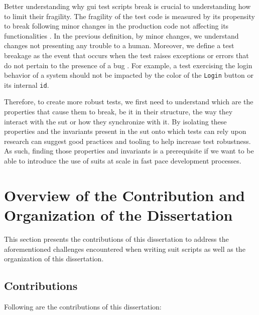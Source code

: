 Better understanding why \gls{gui} test scripts break is crucial to understanding how to limit their fragility. The fragility of the test code is measured by its propensity to break following minor changes in the production code not affecting its functionalities \cite{Garousi2016, Coppola2019}. In the previous definition, by minor changes, we understand changes not presenting any trouble to a human. Moreover, we define a test breakage as the event that occurs when the test raises exceptions or errors that do not pertain to the presence of a bug \cite{Stocco2018}. For example, a test exercising the login behavior of a system should not be impacted by the color of the \texttt{Login} button or its internal \texttt{id}. 

Therefore, to create more robust tests, we first need to understand which are the properties that cause them to break, be it in their structure, the way they interact with the \gls{sut} or how they synchronize with it. By isolating these properties and the invariants present in the \gls{sut} onto which tests can rely upon research can suggest good practices and tooling to help increase test robustness. As such, finding those properties and invariants is a prerequisite if we want to be able to introduce the use of \gls{suit}s at scale in fast pace development processes.

\section{Overview of the Contribution and Organization of the Dissertation}

This section presents the contributions of this dissertation to address the aforementioned challenges encountered when writing \gls{suit} scripts as well as the organization of this dissertation. 

\subsection{Contributions}

Following are the contributions of this dissertation:

